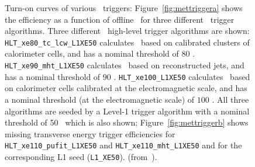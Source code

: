 					\begin{figure}[!htb]
						\begin{center}
							\hspace{0.05\textwidth}
						\end{center}
						\caption{Turn-on curves of various \met\ triggers: Figure~\ref{fig:mettriggera} shows the efficiency as a function of offline \met\ for three different \met\ trigger algorithms. Three different \met\ high-level trigger algorithms are shown: \texttt{HLT\_xe80\_tc\_lcw\_L1XE50} calculates \met\ based on calibrated clusters of calorimeter cells, and has a nominal threshold of 80 \GeV. \texttt{HLT\_xe90\_mht\_L1XE50} calculates \met\ based on reconstructed jets, and has a nominal threshold of $90$ \GeV. \texttt{HLT\_xe100\_L1XE50} calculates \met\ based on calorimeter cells calibrated at the electromagnetic scale, and has a nominal threshold (at the electromagnetic scale) of $100$ \GeV. All three algorithms are seeded by a Level-1 trigger algorithm with a nominal threshold of 50 \GeV\ which is also shown; Figure~\ref{fig:mettriggerb} shows missing transverse energy trigger efficiencies for \texttt{HLT\_xe110\_pufit\_L1XE50} and \texttt{HLT\_xe110\_mht\_L1XE50} and for the corresponding \ac{L1} seed (\texttt{L1\_XE50}). (from~\cite{ATLASMETTriggerPublicPage}).}
						\label{fig:mettrigger}
					\end{figure}
